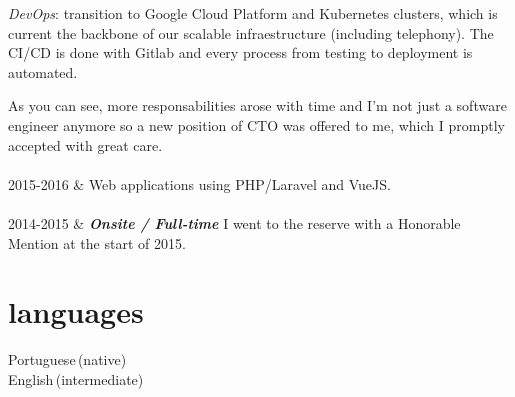 \documentclass[]{cv-mauri}
\begin{document}
\begin{tabularcv}
		    \textit{DevOps}: transition to Google Cloud Platform and Kubernetes clusters, which is current the backbone of our scalable infraestructure (including telephony). The CI/CD is done with Gitlab and every process from testing to deployment is automated.
		    
		    As you can see, more responsabilities arose with time and I'm not just a software engineer anymore so a new position of CTO was offered to me, which I promptly accepted with great care.
		    \\[\vspacepar]
		    \\[\vspacepar]
    2015-2016   &   
                    \newline
                    Web applications using PHP/Laravel and VueJS.
                    \\[\vspacepar]
                    \\[\vspacepar]
	2014-2015   &   
					\textbf{\textit{Onsite / Full-time}}
					\newline
					I went to the reserve with a Honorable Mention at the start of 2015.
\end{tabularcv}

\section*{languages}
\begin{tabularcv}
    Portuguese\,(native) \\
    English\,(intermediate)
\end{tabularcv}

\end{document}
